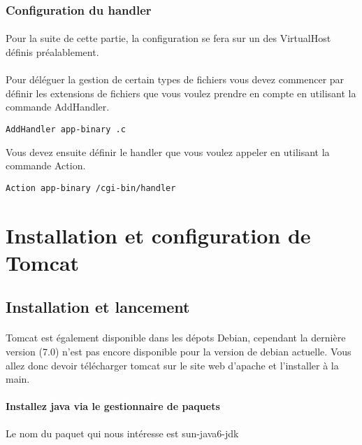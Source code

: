 \documentclass[12pt,a4paper]{article}
\begin{document}
\subsubsection{Configuration du handler}
\paragraph{}
Pour la suite de cette partie, la configuration se fera sur un des VirtualHost définis préalablement.

\paragraph{}
Pour déléguer la gestion de certain types de fichiers vous devez commencer par définir les extensions de fichiers que vous voulez prendre en compte en utilisant la commande AddHandler.

\begin{lstlisting}
AddHandler app-binary .c 
\end{lstlisting}

Vous devez ensuite définir le handler que vous voulez appeler en utilisant la commande Action.

\begin{lstlisting}
Action app-binary /cgi-bin/handler
\end{lstlisting}

\section{Installation et configuration de Tomcat}

\subsection{Installation et lancement}

\paragraph{}
Tomcat est également disponible dans les dépots Debian, cependant la dernière version (7.0) n'est pas encore disponible pour la version de debian actuelle. Vous allez donc devoir télécharger tomcat sur le site web d'apache et l'installer à la main.

\paragraph{Installez java via le gestionnaire de paquets\\}
Le nom du paquet qui nous intéresse est sun-java6-jdk
\end{document}
